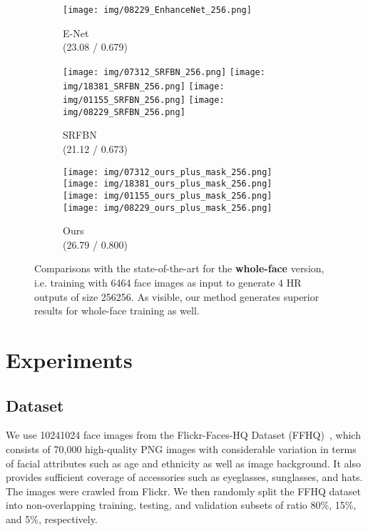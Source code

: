 \documentclass[10pt,twocolumn,letterpaper]{article}
\begin{document}
\begin{figure*}[t]
\begin{center}
\begin{subfigure}[b]{\SizeFigCompareLR\textwidth}
        \texttt{[image: img/08229\_EnhanceNet\_256.png]}
        \caption{E-Net~\cite{sajjadi2017enhancenet} \\ (23.08 / 0.679)}
        \label{fig:EnhanceNet_256}
    \end{subfigure}
    \begin{subfigure}[b]{\SizeFigCompareLR\textwidth}
        \texttt{[image: img/07312\_SRFBN\_256.png]}
        \texttt{[image: img/18381\_SRFBN\_256.png]}
        \texttt{[image: img/01155\_SRFBN\_256.png]}
        \texttt{[image: img/08229\_SRFBN\_256.png]}
        \caption{SRFBN~\cite{li2019feedback} \\ (21.12 / 0.673)}
        \label{fig:SRFBN_256}
    \end{subfigure}
    \begin{subfigure}[b]{\SizeFigCompareLR\textwidth}
        \texttt{[image: img/07312\_ours\_plus\_mask\_256.png]}
        \texttt{[image: img/18381\_ours\_plus\_mask\_256.png]}
        \texttt{[image: img/01155\_ours\_plus\_mask\_256.png]}
        \texttt{[image: img/08229\_ours\_plus\_mask\_256.png]}
        \caption{Ours \\ (26.79 / 0.800)}
        \label{fig:ours_256}
    \end{subfigure}
\end{center}
\vspace{-5mm}
\caption{Comparisons with the state-of-the-art for the \textbf{whole-face} version, i.e. training with 6464 face images as input to generate 4 HR outputs of size 256256. As visible, our method generates superior results for whole-face training as well. 
}
\label{fig:comparison_256}
\end{figure*}
 \section{Experiments}\label{sec:experiment}

\subsection{Dataset} 

We use 10241024 face images from the Flickr-Faces-HQ Dataset (FFHQ)~\cite{karras2019style}, which consists of 70,000 high-quality PNG images with considerable variation in terms of facial attributes such as age and ethnicity as well as image background. It also provides sufficient coverage of accessories such as eyeglasses, sunglasses, and hats. The images were crawled from Flickr. We then randomly split the FFHQ dataset into non-overlapping training, testing, and validation subsets of ratio 80\%, 15\%, and 5\%, respectively.
\end{document}
